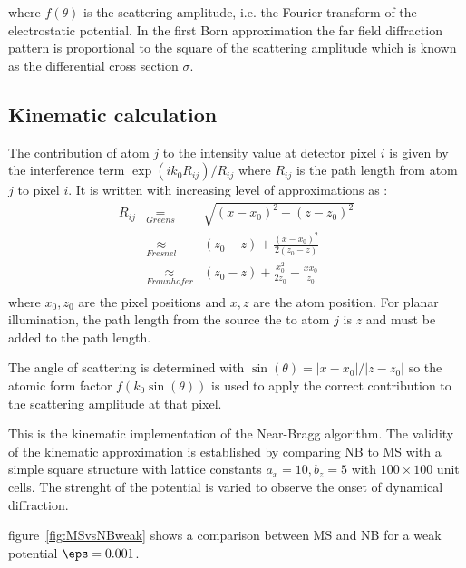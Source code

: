 \documentclass[a4paper,10pt]{article}
\begin{document}
where $f(\theta)$ is the scattering amplitude, i.e. the Fourier transform of the electrostatic potential.
In the first Born approximation the far field diffraction pattern is proportional to the square of the scattering amplitude which is known as the differential cross section $\sigma$.


\subsection{Kinematic calculation}
The contribution of atom $j$ to the intensity value at detector pixel $i$ is given by the interference term $\exp(ik_0 R_{ij})/R_{ij}$ where  $R_{ij}$ is the path length from atom $j$ to pixel $i$.
It is written with increasing level of approximations as :
\begin{eqnarray}
R_{ij}
      &\underset{Greens}{=}& \sqrt{\left(x-x_0\right)^2+\left(z-z_0\right)^2} \\
       &\underset{Fresnel}{\approx}&     \left(z_0-z\right) + \frac{\left(x-x_0\right)^2}{2\left(z_0-z\right)} \\
       &\underset{Fraunhofer}{\approx}&  \left(z_0-z\right) + \frac{x_0^2}{2z_0} - \frac{xx_0}{z_0}  \\
\end{eqnarray}
where $x_0,z_0$ are the pixel positions and $x,z$ are the atom position.
For planar illumination, the path length from the source the to atom $j$ is $z$ and must be added to the path length.

The angle of scattering is determined with $\sin(\theta)=|x-x_0|/|z-z_0|$ so the atomic form factor $f(k_0\sin(\theta))$ is used to apply the correct contribution to the scattering amplitude at that pixel.


This is the kinematic implementation of the Near-Bragg algorithm.
The validity of the kinematic approximation is established by comparing NB to MS with a simple square structure with lattice constants $a_x=10,b_z=5$ with $100\times100$ unit cells.
The strenght of the potential is varied to observe the onset of dynamical diffraction.

figure~\ref{fig:MSvsNBweak} shows a comparison between MS and NB for a weak potential $\eps=0.001$.
\end{document}
